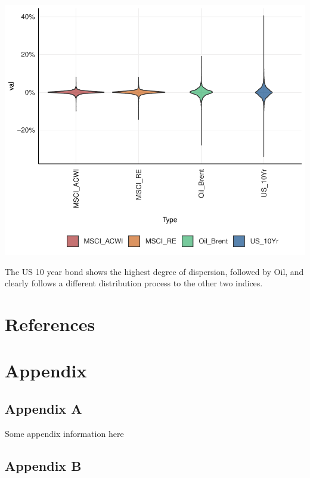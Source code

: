 \documentclass[11pt,preprint, authoryear]{elsarticle}
\numberwithin{equation}{section}
\numberwithin{figure}{section}
\numberwithin{table}{section}
\newlength{\cslhangindent}
\newenvironment{CSLReferences}%
  {\setlength{\parindent}{0pt}%
  \everypar{\setlength{\hangindent}{\cslhangindent}}\ignorespaces}%
  {\par}
\begin{document}
\includegraphics{Question6_files/figure-latex/unnamed-chunk-12-1.pdf}

The US 10 year bond shows the highest degree of dispersion, followed by
Oil, and clearly follows a different distribution process to the other
two indices.

\newpage

\hypertarget{references}{%
\section*{References}\label{references}}

\hypertarget{refs}{}
\begin{CSLReferences}{0}{0}
\end{CSLReferences}

\hypertarget{appendix}{%
\section*{Appendix}\label{appendix}}

\hypertarget{appendix-a}{%
\subsection*{Appendix A}\label{appendix-a}}

Some appendix information here

\hypertarget{appendix-b}{%
\subsection*{Appendix B}\label{appendix-b}}


\end{document}
